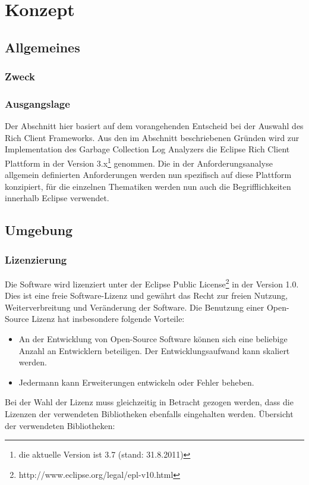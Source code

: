 \chapter{Konzept}
\section{Allgemeines}
\subsection{Zweck}

\subsection{Ausgangslage}
Der Abschnitt hier basiert auf dem vorangehenden Entscheid bei der Auswahl des Rich Client Frameworks. Aus den im Abschnitt  beschriebenen Gründen wird zur Implementation des Garbage Collection Log Analyzers die Eclipse Rich Client Plattform in der Version 3.x\footnote{die aktuelle Version ist 3.7 (stand: 31.8.2011)} genommen. Die in der Anforderungsanalyse allgemein definierten Anforderungen werden nun spezifisch auf diese Plattform konzipiert, für die einzelnen Thematiken werden nun auch die Begrifflichkeiten innerhalb Eclipse verwendet.


\section{Umgebung}
\subsection{Lizenzierung}
Die Software wird lizenziert unter der Eclipse Public License\footnote{http://www.eclipse.org/legal/epl-v10.html} in der Version 1.0. Dies ist eine freie Software-Lizenz und gewährt das Recht zur freien Nutzung, Weiterverbreitung und Veränderung der Software. Die Benutzung einer Open-Source Lizenz hat insbesondere folgende Vorteile:
\begin{itemize}
	\item An der Entwicklung von Open-Source Software können sich eine beliebige Anzahl an Entwicklern beteiligen. Der Entwicklungsaufwand kann skaliert werden.
	\item Jedermann kann Erweiterungen entwickeln oder Fehler beheben.
\end{itemize}

Bei der Wahl der Lizenz muss gleichzeitig in Betracht gezogen werden, dass die Lizenzen der verwendeten Bibliotheken ebenfalls eingehalten werden. Übersicht der verwendeten Bibliotheken:



